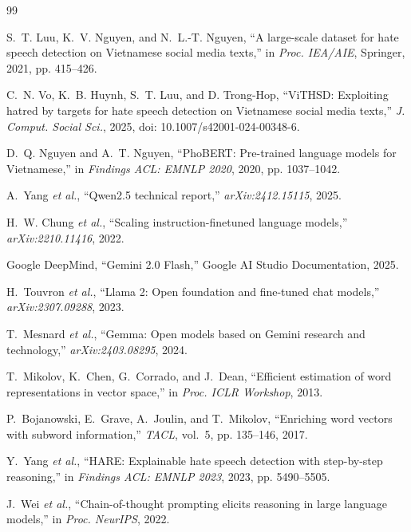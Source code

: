 \documentclass[conference]{IEEEtran}
\begin{document}
\begin{thebibliography}{99}

S.~T. Luu, K.~V. Nguyen, and N.~L.-T. Nguyen, ``A large-scale dataset for hate speech
detection on Vietnamese social media texts,'' in \textit{Proc. IEA/AIE}, Springer,
2021, pp. 415--426.

C.~N. Vo, K.~B. Huynh, S.~T. Luu, and D. Trong-Hop, ``ViTHSD: Exploiting hatred by
targets for hate speech detection on Vietnamese social media texts,'' \textit{J.
Comput. Social Sci.}, 2025, doi: 10.1007/s42001-024-00348-6.

D.~Q. Nguyen and A.~T. Nguyen, ``PhoBERT: Pre-trained language models for
Vietnamese,'' in \textit{Findings ACL: EMNLP 2020}, 2020, pp. 1037--1042.

A.~Yang \textit{et al.}, ``Qwen2.5 technical report,'' \textit{arXiv:2412.15115},
2025.

H.~W. Chung \textit{et al.}, ``Scaling instruction-finetuned language models,''
\textit{arXiv:2210.11416}, 2022.

Google DeepMind, ``Gemini 2.0 Flash,'' Google AI Studio Documentation, 2025.

H.~Touvron \textit{et al.}, ``Llama 2: Open foundation and fine-tuned chat models,''
\textit{arXiv:2307.09288}, 2023.

T.~Mesnard \textit{et al.}, ``Gemma: Open models based on Gemini research and
technology,'' \textit{arXiv:2403.08295}, 2024.

T.~Mikolov, K.~Chen, G.~Corrado, and J.~Dean, ``Efficient estimation of word
representations in vector space,'' in \textit{Proc. ICLR Workshop}, 2013.

P.~Bojanowski, E.~Grave, A.~Joulin, and T.~Mikolov, ``Enriching word vectors with
subword information,'' \textit{TACL}, vol.~5, pp. 135--146, 2017.

Y.~Yang \textit{et al.}, ``HARE: Explainable hate speech detection with step-by-step
reasoning,'' in \textit{Findings ACL: EMNLP 2023}, 2023, pp. 5490--5505.

J.~Wei \textit{et al.}, ``Chain-of-thought prompting elicits reasoning in large
language models,'' in \textit{Proc. NeurIPS}, 2022.


\end{thebibliography}
\end{document}
